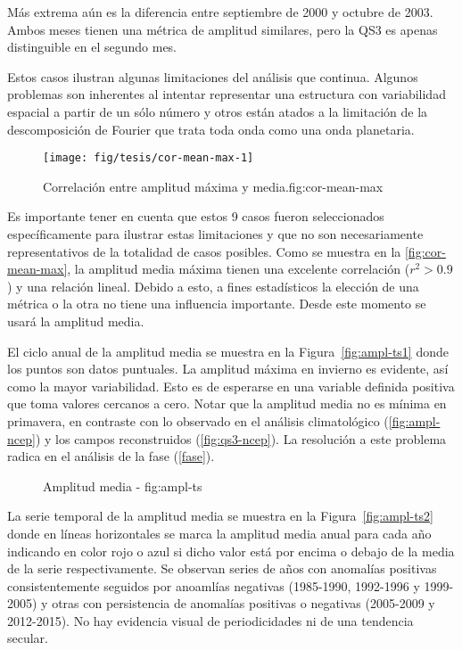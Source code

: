 \documentclass[spanish,a4paper]{book}
\begin{document}
Más extrema aún es la diferencia entre septiembre de 2000 y octubre de
2003. Ambos meses tienen una métrica de amplitud similares, pero la QS3
es apenas distinguible en el segundo mes.

Estos casos ilustran algunas limitaciones del análisis que continua.
Algunos problemas son inherentes al intentar representar una estructura
con variabilidad espacial a partir de un sólo número y otros están
atados a la limitación de la descomposición de Fourier que trata toda
onda como una onda
planetaria.

\begin{figure}
\texttt{[image: fig/tesis/cor-mean-max-1]} \caption{Correlación entre amplitud máxima y media.{fig:cor-mean-max}}\label{fig:cor-mean-max}
\end{figure}

Es importante tener en cuenta que estos 9 casos fueron seleccionados
específicamente para ilustrar estas limitaciones y que no son
necesariamente representativos de la totalidad de casos posibles. Como
se muestra en la \autoref{fig:cor-mean-max}, la amplitud media máxima
tienen una excelente correlación (\(r^2>0.9\)) y una relación lineal.
Debido a esto, a fines estadísticos la elección de una métrica o la otra
no tiene una influencia importante. Desde este momento se usará la
amplitud media.

El ciclo anual de la amplitud media se muestra en la
Figura~\ref{fig:ampl-ts1} donde los puntos son datos puntuales. La
amplitud máxima en invierno es evidente, así como la mayor variabilidad.
Esto es de esperarse en una variable definida positiva que toma valores
cercanos a cero. Notar que la amplitud media no es mínima en primavera,
en contraste con lo observado en el análisis climatológico
(\autoref{fig:ampl-ncep}) y los campos reconstruidos
(\autoref{fig:qs3-ncep}). La resolución a este problema radica en el
análisis de la fase (\autoref{fase}).

\begin{figure*}
\newline{}\caption{Amplitud media - fig:ampl-ts}\label{fig:ampl-ts}
\end{figure*}

La serie temporal de la amplitud media se muestra en la
Figura~\ref{fig:ampl-ts2} donde en líneas horizontales se marca la
amplitud media anual para cada año indicando en color rojo o azul si
dicho valor está por encima o debajo de la media de la serie
respectivamente. Se observan series de años con anomalías positivas
consistentemente seguidos por anoamlías negativas (1985-1990, 1992-1996
y 1999-2005) y otras con persistencia de anomalías positivas o negativas
(2005-2009 y 2012-2015). No hay evidencia visual de periodicidades ni de
una tendencia secular.
\end{document}
